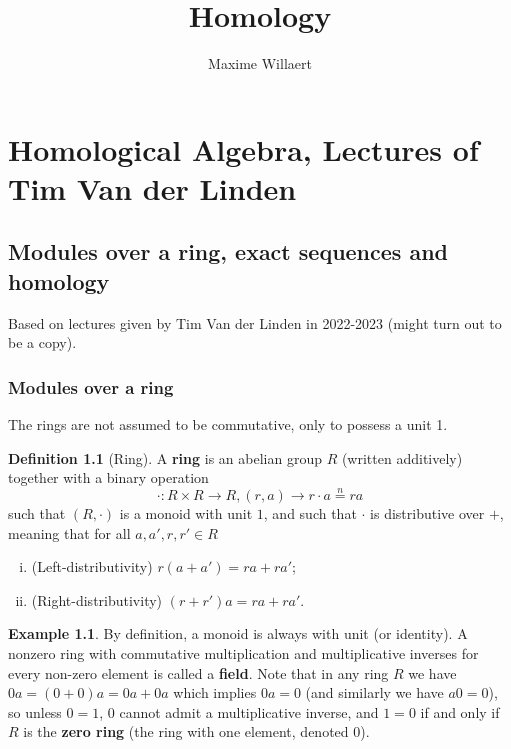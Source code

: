 \documentclass[a4paper,12pt,parskip=half*,chapterprefix=true,numbers=noendperiod]{scrreprt}
\title{Homology}
\author{Maxime Willaert}
\theoremstyle{definition}
\newtheorem{definition}{Definition}[section]
\newtheorem{example}{Example}[section]
\theoremstyle{remark}
\begin{document}
\maketitle

\tableofcontents

\part{Homological Algebra, Lectures of Tim Van der Linden \cite{vanderLinden:Homology}}

\chapter{Modules over a ring, exact sequences and homology}

Based on lectures given by Tim Van der Linden in 2022-2023 \cite{vanderLinden:Homology} (might turn out to be a copy).

\section{Modules over a ring}

The rings are not assumed to be commutative, only to possess a unit 1.
\begin{definition}[Ring]
	A \textbf{ring} is an abelian group $R$ (written additively) together with a binary operation
	\begin{equation*}
		\cdot:R\times R\to R,(r,a)\to r\cdot a\overset{n}{=} ra
	\end{equation*}
	such that $(R,\cdot)$ is a monoid with unit $1$, and such that $\cdot$ is distributive over $+$, meaning that for all $a,a',r,r'\in R$
	\begin{enumerate}[(i)]
		\item (Left-distributivity) $r(a+a')=ra+ra'$;
		\item (Right-distributivity) $(r+r')a=ra+ra'$.
	\end{enumerate}
\end{definition}

\begin{example}
	By definition, a monoid is always with unit (or identity). A nonzero ring with commutative multiplication and multiplicative inverses for every non-zero element is called a \textbf{field}. Note that in any ring $R$ we have $0a=(0+0)a=0a+0a$ which implies $0a=0$ (and similarly we have $a0=0$), so unless $0=1$, $0$ cannot admit a multiplicative inverse, and $1=0$ if and only if $R$ is the \textbf{zero ring} (the ring with one element, denoted $0$).
\end{example}
\end{document}
